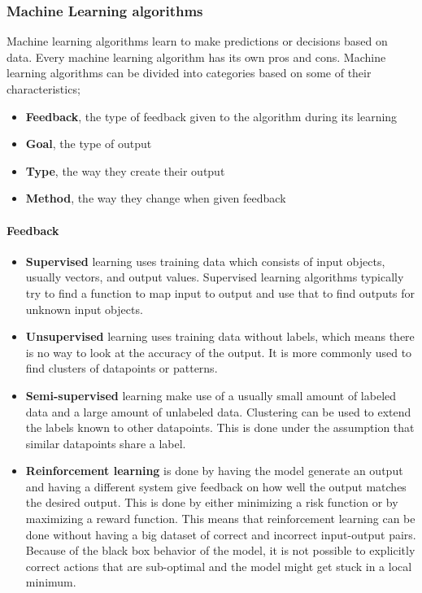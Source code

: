 \subsubsection{Machine Learning algorithms}
Machine learning algorithms learn to make predictions or decisions based on data. Every machine learning algorithm has its own pros and cons. Machine learning algorithms can be divided into categories based on some of their characteristics;
\begin{itemize}
	\item \textbf{Feedback}, the type of feedback given to the algorithm during its learning
	\item \textbf{Goal}, the type of output
	\item \textbf{Type}, the way they create their output
	\item \textbf{Method}, the way they change when given feedback
\end{itemize}

\paragraph{Feedback}
\begin{itemize}
	\item \textbf{Supervised}
		learning uses training data which consists of input objects, usually vectors, and output values. Supervised learning algorithms typically try to find a function to map input to output and use that to find outputs for unknown input objects.
	\item \textbf{Unsupervised}
		learning uses training data without labels, which means there is no way to look at the accuracy of the output. It is more commonly used to find clusters of datapoints or patterns.
	\item \textbf{Semi-supervised}
		learning make use of a usually small amount of labeled data and a large amount of unlabeled data. Clustering can be used to extend the labels known to other datapoints. This is done under the assumption that similar datapoints share a label.
	\item \textbf{Reinforcement learning}
		is done by having the model generate an output and having a different system give feedback on how well the output matches the desired output. This is done by either minimizing a risk function or by maximizing a reward function. This means that reinforcement learning can be done without having a big dataset of correct and incorrect input-output pairs. Because of the black box behavior of the model, it is not possible to explicitly correct actions that are sub-optimal and the model might get stuck in a local minimum.
\end{itemize}

